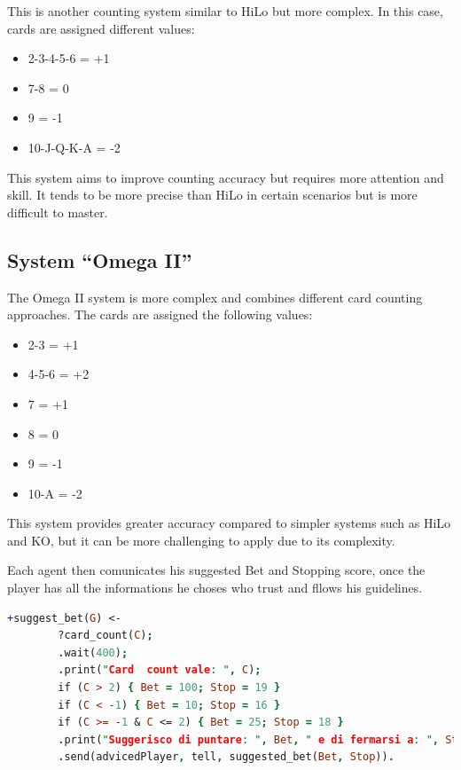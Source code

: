 This is another counting system similar to HiLo but more complex. In this case, cards are assigned different values:

\begin{itemize}
    \item 2-3-4-5-6 = +1
    \item 7-8 = 0
    \item 9 = -1
    \item 10-J-Q-K-A = -2
\end{itemize}

This system aims to improve counting accuracy but requires more attention and skill. It tends to be more precise than HiLo in certain scenarios but is more difficult to master.

\subsection{System ``Omega II''}

The Omega II system is more complex and combines different card counting approaches. The cards are assigned the following values:

\begin{itemize}
    \item 2-3 = +1
    \item 4-5-6 = +2
    \item 7 = +1
    \item 8 = 0
    \item 9 = -1
    \item 10-A = -2
\end{itemize}

This system provides greater accuracy compared to simpler systems such as HiLo and KO, but it can be more challenging to apply due to its complexity.

Each agent then comunicates his suggested Bet and Stopping score, once the player has all the informations he choses who trust and fllows his guidelines. 

\begin{lstlisting}[language=Prolog]
    +suggest_bet(G) <-  
        ?card_count(C);
        .wait(400);
        .print("Card  count vale: ", C);
        if (C > 2) { Bet = 100; Stop = 19 } 
        if (C < -1) { Bet = 10; Stop = 16 } 
        if (C >= -1 & C <= 2) { Bet = 25; Stop = 18 }
        .print("Suggerisco di puntare: ", Bet, " e di fermarsi a: ", Stop);
        .send(advicedPlayer, tell, suggested_bet(Bet, Stop)).
\end{lstlisting}

